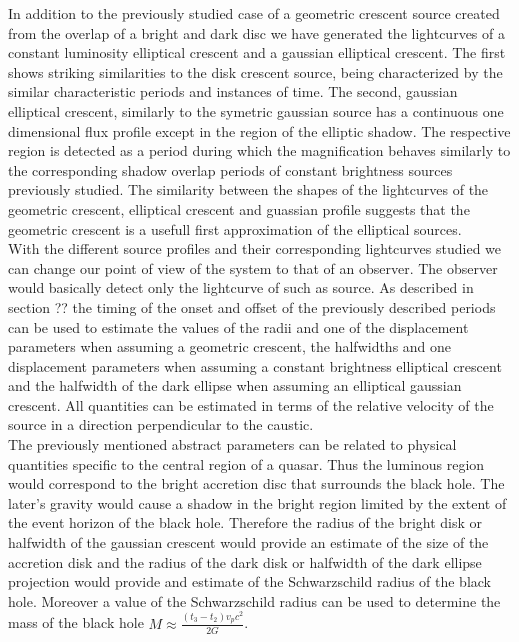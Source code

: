 In addition to the previously studied case of a geometric crescent source created from the overlap of a bright and dark disc we have generated the lightcurves of a constant luminosity elliptical crescent and a gaussian elliptical crescent. The first shows striking similarities to the disk crescent source, being characterized by the similar characteristic periods and instances of time. The second, gaussian elliptical crescent, similarly to the symetric gaussian source has a continuous one dimensional flux profile except in the region of the elliptic shadow. The respective region is detected as a period during which the magnification behaves similarly to the corresponding shadow overlap periods of constant brightness sources previously studied. The similarity between the shapes of the lightcurves of the geometric crescent, elliptical crescent and guassian profile suggests that the geometric crescent is a usefull first approximation of the elliptical sources. \\       

With the different source profiles and their corresponding lightcurves studied we can change our point of view of the system to that of an observer. The observer would basically detect only the lightcurve of such as source. As described in section ?? the timing of the onset and offset of the previously described periods can be used to estimate the values of the radii and one of the displacement parameters when assuming a geometric crescent, the halfwidths and one displacement parameters when assuming a constant brightness elliptical crescent and the halfwidth of the dark ellipse when assuming an elliptical gaussian crescent. All quantities can be estimated in terms of the relative velocity of the source in a direction perpendicular to the caustic.\\

The previously mentioned abstract parameters can be related to physical quantities specific to the central region of a quasar. Thus the luminous region would correspond to the bright accretion disc that surrounds the black hole. The later's gravity would cause a shadow in the bright region limited by the extent of the event horizon of the black hole. Therefore the radius of the bright disk or halfwidth of the gaussian crescent would provide an estimate of the size of the accretion disk and the radius of the dark disk or halfwidth of the dark ellipse projection would provide and estimate of the Schwarzschild radius of the black hole. Moreover a value of the Schwarzschild radius can be used to determine the mass of the black hole $M \approx \frac{\left(t_3 - t_2 \right) v_p c^2}{2G}$. 

